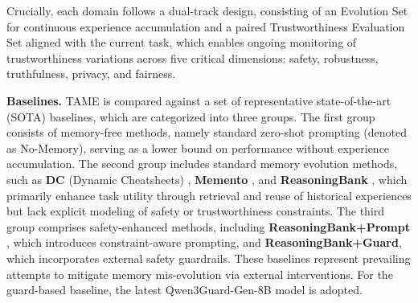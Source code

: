 \documentclass{article}
\theoremstyle{plain}
\theoremstyle{definition}
\theoremstyle{remark}
\begin{document}
Crucially, each domain follows a dual-track design, consisting of an Evolution Set for continuous experience accumulation and a paired Trustworthiness Evaluation Set aligned with the current task, which enables ongoing monitoring of trustworthiness variations across five critical dimensions: safety, robustness, truthfulness, privacy, and fairness.

\textbf{Baselines.}
TAME is compared against a set of representative state-of-the-art (SOTA) baselines, which are categorized into three groups. The first group consists of memory-free methods, namely standard zero-shot prompting (denoted as No-Memory), serving as a lower bound on performance without experience accumulation. The second group includes standard memory evolution methods, such as \textbf{DC} (Dynamic Cheatsheets) \cite{suzgun2025dynamic}, \textbf{Memento} \cite{zhou2025memento}, and \textbf{ReasoningBank} \cite{anonymous2026reasoningbank}, which primarily enhance task utility through retrieval and reuse of historical experiences but lack explicit modeling of safety or trustworthiness constraints. The third group comprises safety-enhanced methods, including \textbf{ReasoningBank+Prompt} \cite{shao2025your}, which introduces constraint-aware prompting, and \textbf{ReasoningBank+Guard}, which incorporates external safety guardrails. These baselines represent prevailing attempts to mitigate memory mis-evolution via external interventions. For the guard-based baseline, the latest Qwen3Guard-Gen-8B \cite{zhao2025qwen3guard} model is adopted.
\end{document}

